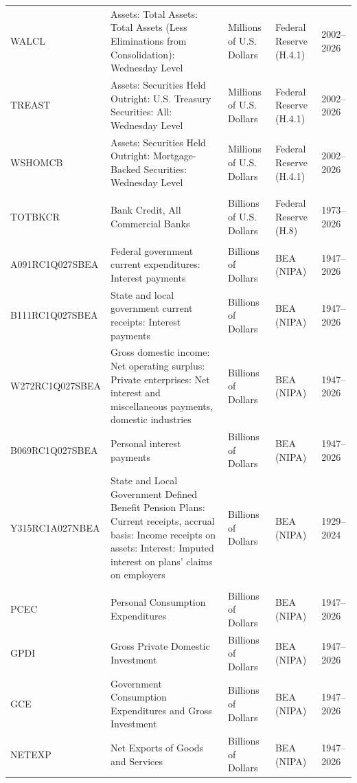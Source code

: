 {\begin{longtable}{@{}l p{5.3cm} p{2.4cm} p{2.7cm} l@{}}
WALCL & Assets: Total Assets: Total Assets (Less Eliminations from Consolidation): Wednesday Level & Millions of U.S. Dollars & Federal Reserve (H.4.1) & 2002--2026 \\
TREAST & Assets: Securities Held Outright: U.S. Treasury Securities: All: Wednesday Level & Millions of U.S. Dollars & Federal Reserve (H.4.1) & 2002--2026 \\
WSHOMCB & Assets: Securities Held Outright: Mortgage-Backed Securities: Wednesday Level & Millions of U.S. Dollars & Federal Reserve (H.4.1) & 2002--2026 \\
\addlinespace\multicolumn{5}{@{}l}{\textit{Bank credit}}\\[2pt]
TOTBKCR & Bank Credit, All Commercial Banks & Billions of U.S. Dollars & Federal Reserve (H.8) & 1973--2026 \\
\addlinespace\multicolumn{5}{@{}l}{\textit{NIPA interest payments}}\\[2pt]
A091RC1Q027SBEA & Federal government current expenditures: Interest payments & Billions of Dollars & BEA (NIPA) & 1947--2026 \\
B111RC1Q027SBEA & State and local government current receipts: Interest payments & Billions of Dollars & BEA (NIPA) & 1947--2026 \\
W272RC1Q027SBEA & Gross domestic income: Net operating surplus: Private enterprises: Net interest and miscellaneous payments, domestic industries & Billions of Dollars & BEA (NIPA) & 1947--2026 \\
B069RC1Q027SBEA & Personal interest payments & Billions of Dollars & BEA (NIPA) & 1947--2026 \\
Y315RC1A027NBEA & State and Local Government Defined Benefit Pension Plans: Current receipts, accrual basis: Income receipts on assets: Interest: Imputed interest on plans' claims on employers & Billions of Dollars & BEA (NIPA) & 1929--2024 \\
\addlinespace\multicolumn{5}{@{}l}{\textit{GDP components}}\\[2pt]
PCEC & Personal Consumption Expenditures & Billions of Dollars & BEA (NIPA) & 1947--2026 \\
GPDI & Gross Private Domestic Investment & Billions of Dollars & BEA (NIPA) & 1947--2026 \\
GCE & Government Consumption Expenditures and Gross Investment & Billions of Dollars & BEA (NIPA) & 1947--2026 \\
NETEXP & Net Exports of Goods and Services & Billions of Dollars & BEA (NIPA) & 1947--2026 \\
\end{longtable}}


